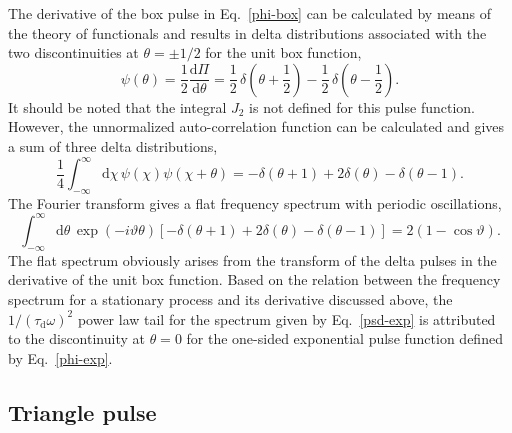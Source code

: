 \documentclass[aps,prb,12pt,a4paper,preprint,amsmath,amssymb,groupedaddress]{revtex4-1}
\newcommand{\rmd}{\text{d}}
\newcommand{\taud}{\ensuremath{\tau_\text{d}}}
\newcommand{\Eqref}[1]{Eq.~\eqref{#1}}
\begin{document}
The derivative of the box pulse in \Eqref{phi-box} can be calculated by means of the theory of functionals and results in delta distributions associated with the two discontinuities at $\theta=\pm1/2$ for the unit box function,
\begin{equation}\label{psi-box}
\psi(\theta) = \frac{1}{2}\frac{\rmd\Pi}{\rmd\theta} = \frac{1}{2}\,\delta\left(\theta+\frac{1}{2}\right) - \frac{1}{2}\,\delta\left(\theta-\frac{1}{2}\right) .
\end{equation}
It should be noted that the integral $J_2$ is not defined for this pulse function. However, the unnormalized auto-correlation function can be calculated and gives a sum of three delta distributions,
\begin{equation}\label{rhopsi-box}
\frac{1}{4}\int_{-\infty}^\infty \rmd\chi\,\psi(\chi)\psi(\chi+\theta) = - \delta(\theta+1) + 2\delta(\theta) - \delta(\theta-1) .
\end{equation}
The Fourier transform gives a flat frequency spectrum with periodic oscillations,
\begin{equation}\label{varrho-box}
\int_{-\infty}^{\infty} \rmd\theta\,\exp(-i\vartheta\theta) \left[ - \delta(\theta+1) + 2\delta(\theta) - \delta(\theta-1) \right] = 2(1-\cos{\vartheta}) .
\end{equation}
The flat spectrum obviously arises from the transform of the delta pulses in the derivative of the unit box function. Based on the relation between the frequency spectrum for a stationary process and its derivative discussed above, the $1/(\taud\omega)^2$ power law tail for the spectrum given by \Eqref{psd-exp} is attributed to the discontinuity at $\theta=0$ for the one-sided exponential pulse function defined by \Eqref{phi-exp}.



\subsection{Triangle pulse}\label{sec:triangle}
\end{document}
